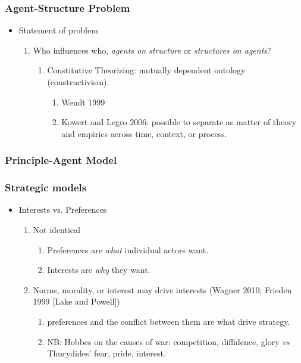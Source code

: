 \documentclass[11pt]{article}
\begin{document}
\subsubsection{Agent-Structure Problem}
\label{sec-1-1-2}
\begin{itemize}
\item Statement of problem
\label{sec-1-1-2-1}
\begin{enumerate}
\item Who influences who, \emph{agents on structure} or \emph{structures on agents}?
\begin{enumerate}
\item Constitutive Theorizing: mutually dependent ontology (constructivism).
\begin{enumerate}
\item Wendt 1999
\item Kowert and Legro 2006: possible to separate as matter of
theory and empirics across time, context, or process.
\end{enumerate}
\end{enumerate}
\end{enumerate}
\end{itemize}
\subsubsection{Principle-Agent Model}
\label{sec-1-1-3}
\subsubsection{Strategic models}
\label{sec-1-1-4}
\begin{itemize}
\item Interests vs. Preferences
\label{sec-1-1-4-1}
\begin{enumerate}
\item Not identical
\begin{enumerate}
\item Preferences are \emph{what} individual actors want.
\item Interests are \emph{why} they want.
\end{enumerate}
\item Norms, morality, or interest may drive interests (Wagner 2010;
Frieden 1999 [Lake and Powell])
\begin{enumerate}
\item preferences and the conflict between them are what drive strategy.
\item NB: Hobbes on the causes of war: competition, diffidence, glory
\emph{vs} Thucydides' fear, pride, interest.
\end{enumerate}
\end{enumerate}
\end{itemize}
\end{document}
